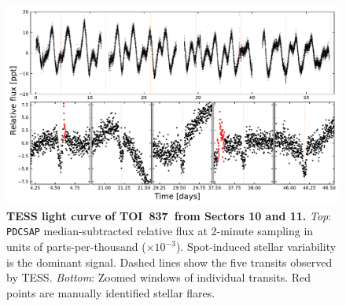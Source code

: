 \documentclass[12pt,twocolumn,tighten]{aastex63}
\newcommand{\tn}{TOI~837} %
\begin{document}
\begin{figure}[!t]
	\begin{center}
		\leavevmode
		\includegraphics[width=1\textwidth]{f1.pdf}
	\end{center}
	\vspace{-0.7cm}
	\caption{
    {\bf TESS light curve of \tn\ from Sectors 10 and 11.} {\it Top}:
    \texttt{PDCSAP} median-subtracted relative flux at 2-minute
    sampling in units of parts-per-thousand ($\times 10^{-3}$).
    Spot-induced stellar variability is the dominant signal.  Dashed
    lines show the five transits observed by TESS.  {\it Bottom}:
    Zoomed windows of individual transits.  Red points are manually
    identified stellar flares.
		\label{fig:rawzoom}
	}
\end{figure}
\end{document}
